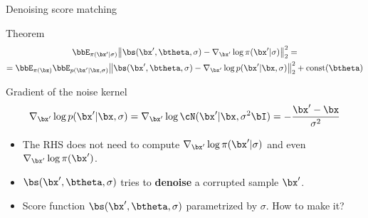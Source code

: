 \begin{frame}{Denoising score matching}
	\begin{block}{Theorem}
	\vspace{-0.5cm}
	\begin{multline*}
		\bbE_{\pi(\bx' | \sigma)}\bigl\| \bs(\bx', \btheta, \sigma) - \nabla_{\bx'} \log \pi(\bx' | \sigma) \bigr\|^2_2 = \\ = \bbE_{\pi(\bx)} \bbE_{p(\bx' | \bx, \sigma)}\bigl\| \bs(\bx', \btheta, \sigma) - \nabla_{\bx'} \log p(\bx' | \bx, \sigma) \bigr\|^2_2 + \text{const}(\btheta)
	\end{multline*}
	\vspace{-0.5cm}
	\end{block}
	\begin{block}{Gradient of the noise kernel}
	\vspace{-0.3cm}
	\[
		\nabla_{\bx'} \log p(\bx' | \bx, \sigma) = \nabla_{\bx'} \log \cN(\bx' | \bx, \sigma^2 \bI) = - \frac{\bx' - \bx}{\sigma^2}
	\]
	\vspace{-0.3cm}
	\end{block}
	\begin{itemize}
		\item The RHS does not need to compute $\nabla_{\bx'} \log \pi(\bx' | \sigma)$ and even $\nabla_{\bx'} \log \pi(\bx')$.
		\item $\bs(\bx', \btheta, \sigma)$ tries to \textbf{denoise} a corrupted sample $\bx'$.
		\item Score function $\bs(\bx', \btheta, \sigma)$ parametrized by $\sigma$. How to make it?
	\end{itemize}
\end{frame}
